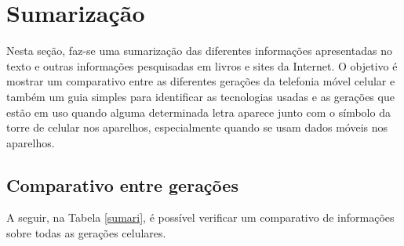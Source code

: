 \documentclass[11pt,oneside,a4paper]{abntex2}
\begin{document}
\section*{Sumarização}
\label{sumarização}

Nesta seção, faz-se uma sumarização das diferentes informações apresentadas no texto e outras informações pesquisadas em livros e sites da Internet. O objetivo é mostrar um comparativo entre as diferentes gerações da telefonia móvel celular e também um guia simples para identificar as tecnologias usadas e as gerações que estão em uso quando alguma determinada letra aparece junto com o símbolo da torre de celular nos aparelhos, especialmente quando se usam dados móveis nos aparelhos.

\subsection*{Comparativo entre gerações}

A seguir, na Tabela \ref{sumari}, é possível verificar um comparativo de informações sobre todas as gerações celulares.
\end{document}
